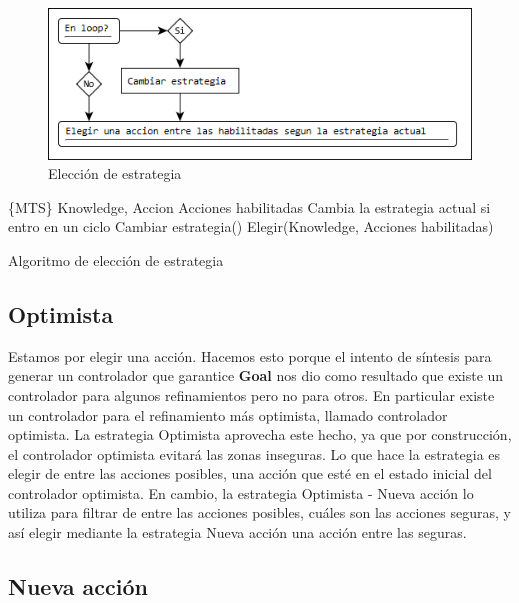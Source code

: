\begin{figure}[H]
  \centering
    \includegraphics[scale=0.75]{Imagenes/Algoritmo/Algoritmo_elegir_1.png}
  \caption{Elección de estrategia}
  \label{fig:Algoritmo_elegir_1}
\end{figure}

\begin{algorithm}
\begin{algorithmic}
\REQUIRE \{MTS\} Knowledge, {Accion} Acciones habilitadas
\ENSURE Cambia la estrategia actual si entro en un ciclo
\STATE Cambiar estrategia()
\ENDIF
\STATE Elegir(Knowledge, Acciones habilitadas)
\end{algorithmic}
\caption{Algoritmo de elección de estrategia}
\end{algorithm}


\subsection{Optimista}

Estamos por elegir una acción. Hacemos esto porque el intento de síntesis para generar un controlador que garantice \textbf{Goal} nos dio como resultado que 
existe un controlador para algunos refinamientos pero no para otros. En particular existe un controlador para el refinamiento más optimista, llamado 
controlador optimista. La estrategia Optimista aprovecha este hecho, ya que por construcción, el controlador optimista evitará las zonas inseguras. Lo que 
hace la estrategia es elegir de entre las acciones posibles, una acción que esté en el estado inicial del controlador optimista. En cambio, la estrategia 
Optimista - Nueva acción lo utiliza para filtrar de entre las acciones posibles, cuáles son las acciones seguras, y así elegir mediante la estrategia Nueva acción 
una acción entre las seguras.

\subsection{Nueva acción}


